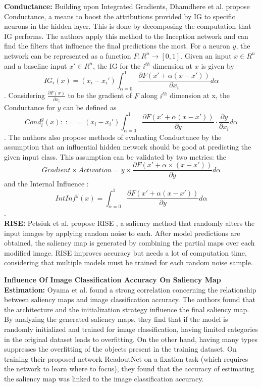 \documentclass[a4paper,11pt,openright]{book}
\begin{document}
\textbf{Conductance: }
Building upon Integrated Gradients, Dhamdhere et al. propose \cite{dhamdhereHowImportantNeuron2018} Conductance, a means to boost the attributions provided by IG to specific neurons in the hidden layer. This is done by decomposing the computation that IG performs. The authors apply this method to the Inception network \cite{szegedyGoingDeeperConvolutions2014} and can find the filters that influence the final predictions the most. 
For a neuron $y$, the network can be represented as a function $F: R^{n} \rightarrow [0,1]$. Given an input $x \in R^{n}$ and a baseline input $x' \in R^{n}$, the IG for the $i^{th}$ dimension at $x$ is given by $$IG_{i}(x) = (x_{i}- x_{i}') \int_{\alpha=0}^{1} \frac{\partial F(x' + \alpha(x-x'))}{\partial x_{i}}d \alpha$$ . Considering $\frac{\partial F(x)}{\partial x_{i}}$ to be the gradient of $F$ along $i^{th}$ dimension at x, the Conductance for $y$ can be defined as $$
Cond_{i}^{y}(x) ::== (x_{i}- x_{i}') \int_{\alpha=0}^{1} \frac{\partial F(x' + \alpha(x-x'))}{\partial y} \cdot \frac{\partial y}{\partial x_{i}} d \alpha$$. The authors also propose methods of evaluating Conductance by the assumption that an influential hidden network should be good at predicting the given input class. This assumption can be validated by two metrics: the $$Gradient\times Activation = 
y \times \frac{\partial F(x' + \alpha \times (x-x'))}{\partial y} d \alpha$$ and the Internal Influence : $$
IntInf ^{y}(x) = \int^{1}_{\alpha=0} \frac{\partial F(x' + \alpha(x-x'))}{\partial y} d \alpha$$.\\
\textbf{RISE: }
Petsiuk et al. propose RISE \cite{petsiukRISERandomizedInput2018}, a saliency method that randomly alters the input images by applying random noise to each. After model predictions are obtained, the saliency map is generated by combining the partial maps over each modified image. RISE improves accuracy but needs a lot of computation time, considering that multiple models must be trained for each random noise sample.

\textbf{Influence Of Image Classification Accuracy On Saliency Map Estimation: }
Oyama et al. \cite{oyamaInfluenceImageClassification2018} found a strong correlation concerning the relationship between saliency maps and image classification accuracy. The authors found that the architecture and the initialization strategy influence the final saliency map. By analyzing the generated saliency maps, they find that if the model is randomly initialized and trained for image classification, having limited categories in the original dataset leads to overfitting. On the other hand, having many types suppresses the overfitting of the objects present in the training dataset. On training their proposed network ReadoutNet on a fixation task (which requires the network to learn where to focus), they found that the accuracy of estimating the saliency map was linked to the image classification accuracy.
\end{document}
